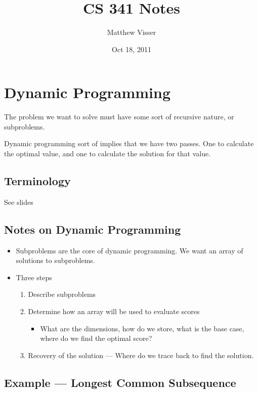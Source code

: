 \documentclass[12pt]{article}
\begin{document}
\title{CS 341 Notes}
\author{Matthew Visser}
\date{Oct 18, 2011}
\maketitle


\section{Dynamic Programming}

The problem we want to solve must have some sort of recursive nature, or
subproblems.

Dynamic programming sort of implies that we have two passes. One to calculate
the optimal value, and one to calculate the solution for that value.

\subsection{Terminology}

See slides

\subsection{Notes on Dynamic Programming}

\begin{itemize}
	\item Subproblems are the core of dynamic programming. We want an array of
		solutions to subproblems.
	\item Three steps
		\begin{enumerate}
			\item Describe subproblems
			\item Determine how an array will be used to evaluate scores
				\begin{itemize}
					\item What are the dimensions, how do we store, what is the
						base case, where do we find the optimal score?
				\end{itemize}
			\item Recovery of the solution --- Where do we trace back to find
				the solution.
		\end{enumerate}
\end{itemize}

\subsection{Example --- Longest Common Subsequence}
\end{document}
